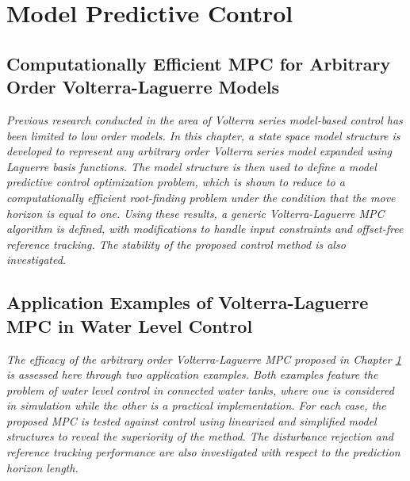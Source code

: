 \documentclass[11pt,twoside]{report}
\begin{document}
\part{Model Predictive Control}
\label{part:MPC}

\cleardoublepage
\chapter{Computationally Efficient MPC for Arbitrary Order Volterra-Laguerre Models}
\label{chap:10}
\emph{Previous research conducted in the area of Volterra series model-based control has been limited to low order models. In this chapter, a state space model structure is developed to represent any arbitrary order Volterra series model expanded using Laguerre basis functions. The model structure is then used to define a model predictive control optimization problem, which is shown to reduce to a computationally efficient root-finding problem under the condition that the move horizon is equal to one. Using these results, a generic Volterra-Laguerre MPC algorithm is defined, with modifications to handle input constraints and offset-free reference tracking. The stability of the proposed control method is also investigated.}
\newpage


\cleardoublepage
\chapter{Application Examples of Volterra-Laguerre MPC in Water Level Control}
\label{chap:11}
\emph{The efficacy of the arbitrary order Volterra-Laguerre MPC proposed in Chapter \ref{chap:10} is assessed here through two application examples. Both examples feature the problem of water level control in connected water tanks, where one is considered in simulation while the other is a practical implementation. For each case, the proposed MPC is tested against control using linearized and simplified model structures to reveal the superiority of the method. The disturbance rejection and reference tracking performance are also investigated with respect to the prediction horizon length.}
\newpage


\end{document}
